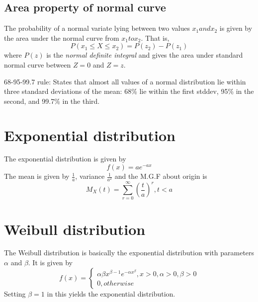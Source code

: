 \documentclass{article}
\begin{document}
\subsection{Area property of normal curve}
The probability of a normal variate lying between two values $ x_{1} and x_{2} $ is given by the area under the normal curve from $ x_{1} to x_{2} $. That is,
\begin{equation*}
P(x_{1} \leq X \leq x_{2}) = P(z_{2}) - P(z_{1})
\end{equation*}
where $ P(z) $ is the \textit{normal definite integral} and gives the area under standard normal curve between $ Z = 0 $ and $ Z = z $.  

\begin{theorem}
    68-95-99.7 rule: States that almost all values of a normal distribution lie within three standard deviations of the mean: 68\% lie within
    the first stddev, 95\% in the second, and 99.7\% in the third.
\end{theorem}

\section{Exponential distribution}
The exponential distribution is given by 
\begin{equation*}
f(x) = ae^{-ax}
\end{equation*}
The mean is given by $ \frac{1}{a} $, variance $ \frac{1}{a^{2}} $ and the M.G.F about origin is
\begin{equation*}
M_{X}(t) = \sum_{r=0}^{\infty}(\frac{t}{a})^{r}, t < a
\end{equation*}

\section{Weibull distribution}
The Weibull distribution is basically the exponential distribution with parameters $ \alpha $ and $ \beta $. It is given by
\begin{equation*}
f(x) = \begin{cases}
    \alpha \beta x^{\beta -1} e^{-\alpha x^{\beta}}, x >0, \alpha > 0, \beta > 0 \\
    0, otherwise
\end{cases}
\end{equation*}  
Setting $ \beta = 1 $ in this yields the exponential distribution. 
\end{document}
